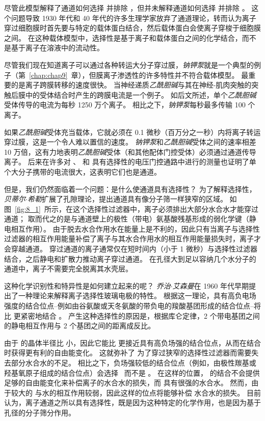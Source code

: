 尽管此模型解释了通道如何选择  并排除 ，但并未解释通道如何选择  并排除 。
这个问题导致 1930 年代和 40 年代的许多生理学家放弃了通道理论，转而认为离子穿过细胞膜时首先要与特定的载体蛋白结合，然后载体蛋白会使离子穿梭于细胞膜之间。
在这种载体模型中，选择性是基于离子和载体蛋白之间的化学结合，而不是基于离子在溶液中的流动性。


尽管我们现在知道离子可以通过各种转运大分子穿过膜，\textit{钠钾泵}就是一个典型的例子（第~\ref{chap:chap9}~章），但膜离子渗透性的许多特性并不符合载体模型。
最重要的是离子跨膜转移的速度很快。 
当神经递质\textit{乙酰胆碱}与其在神经-肌肉突触的突触后膜中的受体结合时产生的跨膜电流是一个例子。
如后文所述，单个\textit{乙酰胆碱}受体传导的电流为每秒 1250 万个离子。
相比之下，\textit{钠钾泵}每秒最多传输 100 个离子。


如果\textit{乙酰胆碱}受体充当载体，它就必须在 0.1 微秒（百万分之一秒）内将离子转运穿过膜，这是一个令人难以置信的速度。
\textit{钠钾泵}和\textit{乙酰胆碱}受体之间的速率相差 10 万倍，这有力地表明\textit{乙酰胆碱}受体（和其他配体门控受体）必须通过通道传导离子。
后来在许多对 、 和  具有选择性的电压门控通路中进行的测量也证明了单个大分子携带的电流很大，这表明它们也是通道。


但是，我们仍然面临着一个问题：是什么使通道具有选择性？
为了解释选择性，\textit{贝蒂尔$\cdot$希勒}扩展了孔隙理论，提出通道具有像分子筛一样狭窄的区域。
如图~\ref{fig:8_1}~所示，在这个选择性过滤器中，离子必须排出大部分水合水才能穿过通道；
取而代之的是与通道壁上的极性（带电）氨基酸残基形成的弱化学键（静电相互作用）。
由于脱去水合作用水在能量上是不利的，因此只有当离子与选择性过滤器的相互作用能量补偿了离子与其水合作用水的相互作用能量损失时，离子才会穿越通道。
穿过通道的离子通常仅在短时间内（小于 1 微秒）与选择性过滤器结合，之后静电和扩散力推动离子穿过通道。
在孔径大到足以容纳几个水分子的通道中，离子不需要完全脱离其水壳层。


这种化学识别性和特异性是如何建立起来的呢？
\textit{乔治$\cdot$艾森曼}在 1960 年代早期提出了一种理论来解释离子选择性玻璃电极的特性。
根据这一理论，具有高负电场强度的结合位点--例如由谷氨酸或天冬氨酸的带负电的羧酸基团形成的结合位点--将比  更紧密地结合 。
产生这种选择性的原因是，根据库仑定律，2 个带电基团之间的静电相互作用与 2 个基团之间的距离成反比。


由于  的晶体半径比  小，因此它能比  更接近具有高负场强的结合位点，从而在结合时获得更有利的自由能变化。
这就弥补了  为了穿过狭窄的选择性过滤器而需要失去部分水合水的不足。
相比之下，负场强较低的结合位点（例如，由极性羰基或羟基氧原子组成的结合位点）会选择~ 而不是 。
在这样的位置， 的结合不会提供足够的自由能变化来补偿离子的水合水的损失，而  具有很强的水合水。
然而，由于较大的  与水的相互作用较弱，因此这样的位点将能够补偿  水合水的损失。
目前认为，离子通道之所以具有选择性，既是因为这种特定的化学作用，也是因为基于孔径的分子筛分作用。



